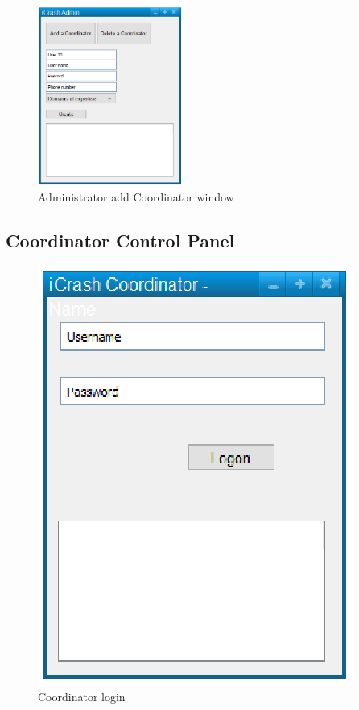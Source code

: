 \begin{figure}
  \centering
    \includegraphics[width=4.8cm]{images/mockups/feature1-login/AdminAddCoordinator.eps}
  \caption{Administrator add Coordinator window}
  \label{fig:AdminAddCoordinator}
\end{figure}


\subsection{Coordinator Control Panel}

\begin{figure}
  \centering
    \includegraphics{images/mockups/feature1-login/CoordinatorLogon.eps}
  \caption{Coordinator login}
  \label{fig:CoordinatorLogin}
\end{figure}



